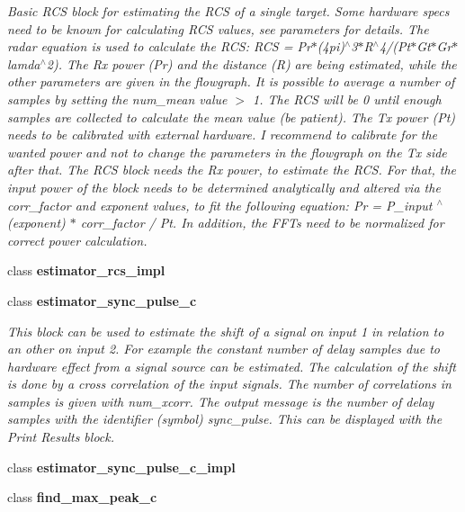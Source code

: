 \begin{DoxyCompactItemize}
\begin{DoxyCompactList}\small\item\em Basic R\+CS block for estimating the R\+CS of a single target. Some hardware specs need to be known for calculating R\+CS values, see parameters for details. The radar equation is used to calculate the R\+CS\+: R\+CS = Pr$\ast$(4pi)$^\wedge$3$\ast$\+R$^\wedge$4/(Pt$\ast$\+Gt$\ast$\+Gr$\ast$lamda$^\wedge$2). The Rx power (Pr) and the distance (R) are being estimated, while the other parameters are given in the flowgraph. It is possible to average a number of samples by setting the num\+\_\+mean value $>$ 1. The R\+CS will be 0 until enough samples are collected to calculate the mean value (be patient). The Tx power (Pt) needs to be calibrated with external hardware. I recommend to calibrate for the wanted power and not to change the parameters in the flowgraph on the Tx side after that. The R\+CS block needs the Rx power, to estimate the R\+CS. For that, the input power of the block needs to be determined analytically and altered via the corr\+\_\+factor and exponent values, to fit the following equation\+: Pr = P\+\_\+input $^\wedge$ (exponent) $\ast$ corr\+\_\+factor / Pt. In addition, the F\+F\+Ts need to be normalized for correct power calculation. \end{DoxyCompactList}\item 
class {\bf estimator\+\_\+rcs\+\_\+impl}
\item 
class {\bf estimator\+\_\+sync\+\_\+pulse\+\_\+c}
\begin{DoxyCompactList}\small\item\em This block can be used to estimate the shift of a signal on input 1 in relation to an other on input 2. For example the constant number of delay samples due to hardware effect from a signal source can be estimated. The calculation of the shift is done by a cross correlation of the input signals. The number of correlations in samples is given with num\+\_\+xcorr. The output message is the number of delay samples with the identifier (symbol) \textquotesingle{}sync\+\_\+pulse\textquotesingle{}. This can be displayed with the \textquotesingle{}Print Results\textquotesingle{} block. \end{DoxyCompactList}\item 
class {\bf estimator\+\_\+sync\+\_\+pulse\+\_\+c\+\_\+impl}
\item 
class {\bf find\+\_\+max\+\_\+peak\+\_\+c}

\end{DoxyCompactItemize}
